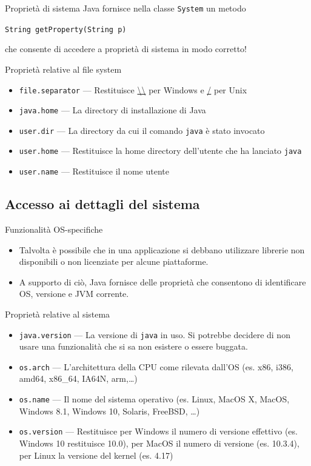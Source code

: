 \documentclass[presentation]{beamer}
\begin{document}
\begin{frame}{Proprietà di sistema}
	Java fornisce nella classe \texttt{System} un metodo\\
	\begin{center}
	{\Large \texttt{String getProperty(String p)}}
	\end{center}
	che consente di accedere a proprietà di sistema in modo corretto!
	\vspace{10pt}
	\begin{block}{Proprietà relative al file system}
		\begin{itemize}
			\item \texttt{file.separator} --- Restituisce \url{\\} per Windows e \url{/} per Unix
			\item \texttt{java.home} --- La directory di installazione di Java
			\item \texttt{user.dir} --- La directory da cui il comando \texttt{java} è stato invocato
			\item \texttt{user.home} --- Restituisce la home directory dell'utente che ha lanciato \texttt{java}
			\item \texttt{user.name} --- Restituisce il nome utente
		\end{itemize}
	\end{block}
\end{frame}

\subsection{Accesso ai dettagli del sistema}

\begin{frame}{Funzionalità OS-specifiche}
	\begin{itemize}
	\item Talvolta è possibile che in una applicazione si debbano utilizzare librerie non disponibili o non licenziate per alcune piattaforme.
	\item A supporto di ciò, Java fornisce delle proprietà che consentono di identificare OS, versione e JVM corrente.
	\end{itemize}
	\begin{block}{Proprietà relative al sistema}
	\begin{itemize}
	\item \texttt{java.version} --- La versione di \texttt{java} in uso. Si potrebbe decidere di non usare una funzionalità che si sa non esistere o essere buggata.
	\item \texttt{os.arch} --- L'architettura della CPU come rilevata dall'OS (es. x86, i386, amd64, x86\_64, IA64N, arm,\dots)
	\item \texttt{os.name} --- Il nome del sistema operativo (es. Linux, MacOS X, MacOS, Windows 8.1, Windows 10, Solaris, FreeBSD, \dots)
	\item \texttt{os.version} --- Restituisce per Windows il numero di versione effettivo (es. 
Windows 10 restituisce 10.0), per MacOS il numero di versione (es. 10.3.4), per Linux la versione 
del kernel (es. 4.17)
	\end{itemize}
	\end{block}
\end{frame}
\end{document}
